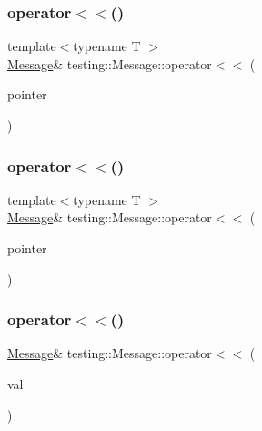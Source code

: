 \mbox{\label{classtesting_1_1_message_aa3ab685879958f90d2d8cd5b68d10c34}} 
\subsubsection{\texorpdfstring{operator$<$$<$()}{operator<<()}\hspace{0.1cm}{\footnotesize\ttfamily [5/18]}}
{\footnotesize\ttfamily template$<$typename T $>$ \\
\mbox{\hyperlink{classtesting_1_1_message}{Message}}\& testing\+::\+Message\+::operator$<$$<$ (\begin{DoxyParamCaption}\item[{T $\ast$const \&}]{pointer }\end{DoxyParamCaption})\hspace{0.3cm}{\ttfamily [inline]}}

\mbox{\label{classtesting_1_1_message_aa3ab685879958f90d2d8cd5b68d10c34}} 
\subsubsection{\texorpdfstring{operator$<$$<$()}{operator<<()}\hspace{0.1cm}{\footnotesize\ttfamily [6/18]}}
{\footnotesize\ttfamily template$<$typename T $>$ \\
\mbox{\hyperlink{classtesting_1_1_message}{Message}}\& testing\+::\+Message\+::operator$<$$<$ (\begin{DoxyParamCaption}\item[{T $\ast$const \&}]{pointer }\end{DoxyParamCaption})\hspace{0.3cm}{\ttfamily [inline]}}

\mbox{\label{classtesting_1_1_message_a3a71a1c1c8ea52de5852d75483d41453}} 
\subsubsection{\texorpdfstring{operator$<$$<$()}{operator<<()}\hspace{0.1cm}{\footnotesize\ttfamily [7/18]}}
{\footnotesize\ttfamily \mbox{\hyperlink{classtesting_1_1_message}{Message}}\& testing\+::\+Message\+::operator$<$$<$ (\begin{DoxyParamCaption}\item[{\mbox{\hyperlink{classtesting_1_1_message_ad398b70e2a11b923cef05c809b0eeb92}{Basic\+Narrow\+Io\+Manip}}}]{val }\end{DoxyParamCaption})\hspace{0.3cm}{\ttfamily [inline]}}

